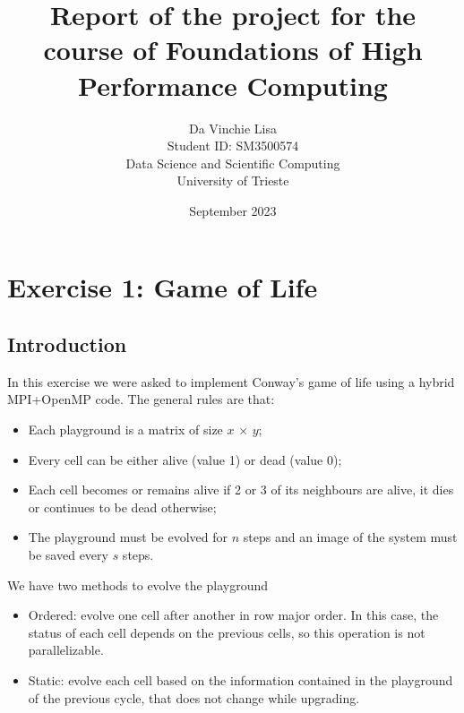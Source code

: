 \documentclass[12pt]{article}
\title{Report of the project for the course of Foundations of High Performance Computing}
\author{Da Vinchie Lisa\\
\AND
Student ID: SM3500574\\
\AND
\AND
\AND
\AND
	Data Science and Scientific Computing\\
\AND
	University of Trieste\\
}
\date{September 2023}
\begin{document}
\maketitle

\newpage
\tableofcontents
\thispagestyle{empty}

\newpage
\thispagestyle{empty}

\begin{abstract}
\end{abstract}




\newpage
\setcounter{page}{1}

\section{Exercise 1: Game of Life}
    \subsection{Introduction}
    In this exercise we were asked to implement Conway's game of life using a hybrid MPI+OpenMP code. The general rules are that:
    \begin{itemize}
        \item Each playground is a matrix of size  $x\,\times\,y$;
        \item Every cell can be either alive (value 1) or dead (value 0);
        \item Each cell becomes or remains alive if 2 or 3 of its neighbours are alive, it dies or continues to be dead otherwise;
        \item The playground must be evolved for $n$ steps and an image of the system must be saved every $s$ steps.
    \end{itemize}

    We have two methods to evolve the playground
    \begin{itemize}
        \item Ordered: evolve one cell after another in row major order. In this case, the status of each cell depends on the previous cells, so this operation is not parallelizable.
        \item Static: evolve each cell based on the information contained in the playground of the previous cycle, that does not change while upgrading.
    \end{itemize}
\end{document}
